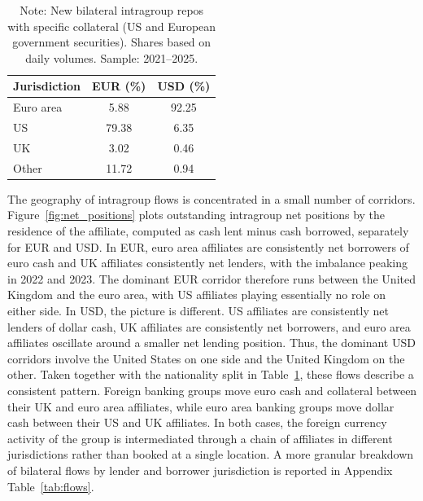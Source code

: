 \documentclass[english, 11pt, oneside, legal]{article}
\begin{document}
\begin{table}[t]
\centering
\caption{Share of intragroup volumes by nationality of the banking group}
\label{tab:nationality}
\begin{tabular}{lcc}
\hline
Jurisdiction & EUR (\%) & USD (\%) \\
\hline
Euro area    &  5.88 & 92.25 \\
US           & 79.38 &  6.35 \\
UK           &  3.02 &  0.46 \\
Other        & 11.72 &  0.94 \\
\hline
\end{tabular}
\caption*{\footnotesize Note: New bilateral intragroup repos with specific collateral (US and European government securities). Shares based on daily volumes. Sample: 2021--2025.}
\end{table}


The geography of intragroup flows is concentrated in a small number of corridors. Figure~\ref{fig:net_positions} plots outstanding intragroup net positions by the residence of the affiliate, computed as cash lent minus cash borrowed, separately for EUR and USD. In EUR, euro area affiliates are consistently net borrowers of euro cash and UK affiliates consistently net lenders, with the imbalance peaking in 2022 and 2023. The dominant EUR corridor therefore runs between the United Kingdom and the euro area, with US affiliates playing essentially no role on either side. In USD, the picture is different. US affiliates are consistently net lenders of dollar cash, UK affiliates are consistently net borrowers, and euro area affiliates oscillate around a smaller net lending position. Thus, the dominant USD corridors involve the United States on one side and the United Kingdom on the other. Taken together with the nationality split in Table~\ref{tab:nationality}, these flows describe a consistent pattern. Foreign banking groups move euro cash and collateral between their UK and euro area affiliates, while euro area banking groups move dollar cash between their US and UK affiliates. In both cases, the foreign currency activity of the group is intermediated through a chain of affiliates in different jurisdictions rather than booked at a single location. A more granular breakdown of bilateral flows by lender and borrower jurisdiction is reported in Appendix Table~\ref{tab:flows}.
\end{document}
